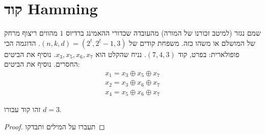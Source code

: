 \documentclass[]{article}
\begin{document}
	\section{קוד Hamming}
	שמם נגזר (למיטב זכורנו של המורה) מהעובדה שכדורי ההאמינג ברדיוס $1$ מהווים ריצוף מרחק של המושלם או משהו כזה. 
	משפחת קודים של $(n, k, d) = (2^{t}, 2^{t} - 1, 3)$. הדוגמה הכי פופולארית: 
	בפרט, קוד $(7, 4, 3)$. נניח שהקלט הוא $x_3, x_5, x_6, x_7$. נוסיף את הביטים החסרים. נוסיף את הביטים: 
	\begin{align*}
		x_1 = x_3 \oplus x_5 \oplus x_7 \\
		x_2 = x_3 \oplus  x_6 \oplus x_7 \\
		x_4 = x_5 \oplus x_6 \oplus x_7
	\end{align*}
	
	זהו קוד עבורו $d = 3$. 
	\begin{proof}
		תעברו על המילים ותבדקו
	\end{proof}
	
\end{document}
